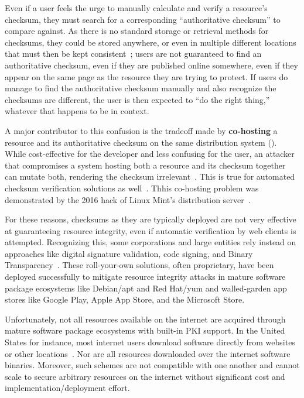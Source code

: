 Even if a user feels the urge to manually calculate and verify a resource's
checksum, they must search for a corresponding ``authoritative checksum'' to
compare against. As there is no standard storage or retrieval methods for
checksums, they could be stored anywhere, or even in multiple different
locations that must then be kept consistent~\cite{Cherubini}; users are not
guaranteed to find an authoritative checksum, even if they are published online
somewhere, even if they appear on the same page as the resource they are trying
to protect. If users do manage to find the authoritative checksum manually and
also recognize the checksums are different, the user is then expected to ``do
the right thing,'' whatever that happens to be in context.

A major contributor to this confusion is the tradeoff made by
\textbf{co-hosting} a resource and its authoritative checksum on the same
distribution system (). While cost-effective for
the developer and less confusing for the user, an attacker that compromises a
system hosting both a resource and its checksum together can mutate both,
rendering the checksum irrelevant~\cite{Stickler}. This is true for automated
checksum verification solutions as well~\cite{Cherubini}. Thhis co-hosting
problem was demonstrated by the 2016 hack of Linux Mint's distribution
server~\cite{SCA-MINT1, SCA-MINT2}.

For these reasons, checksums as they are typically deployed are not very
effective at guaranteeing resource integrity, even if automatic verification by
web clients is attempted. Recognizing this, some corporations and large entities
rely instead on approaches like digital signature validation, code signing, and
Binary Transparency~\cite{PKI, BinaryTransparency}. These roll-your-own
solutions, often proprietary, have been deployed successfully to mitigate
resource integrity attacks in mature software package ecosystems like Debian/apt
and Red Hat/yum and walled-garden app stores like Google Play, Apple App Store,
and the Microsoft Store.

Unfortunately, not all resources available on the internet are acquired through
mature software package ecosystems with built-in PKI support. In the United
States for instance, most internet users download software directly from
websites or other locations~\cite{Cherubini, Ryan}. Nor are all resources
downloaded over the internet software binaries. Moreover, such schemes are not
compatible with one another and cannot scale to secure arbitrary resources on
the internet without significant cost and implementation/deployment effort.

